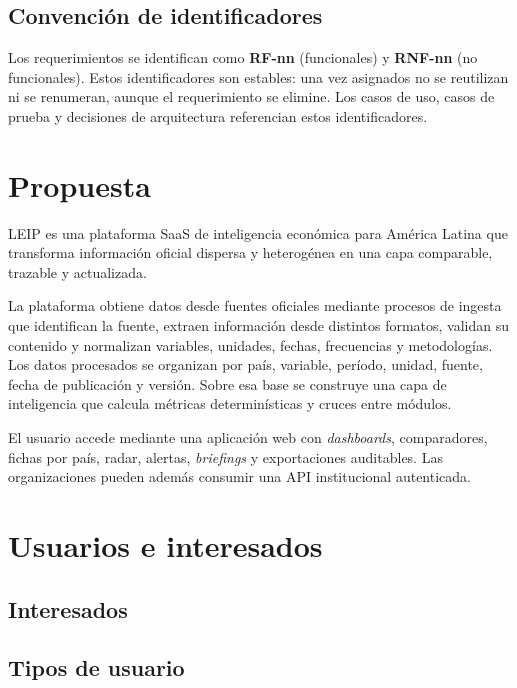 \documentclass[11pt,a4paper]{article}
\newcommand{\proyectoNombre}{LEIP}
\begin{document}
\subsection{Convenci\'on de identificadores}

Los requerimientos se identifican como \textbf{RF-nn} (funcionales) y
\textbf{RNF-nn} (no funcionales). Estos identificadores son estables: una vez
asignados no se reutilizan ni se renumeran, aunque el requerimiento se elimine.
Los casos de uso, casos de prueba y decisiones de arquitectura referencian estos
identificadores.

\section{Propuesta}

\proyectoNombre{} es una plataforma SaaS de inteligencia econ\'omica para
Am\'erica Latina que transforma informaci\'on oficial dispersa y heterog\'enea
en una capa comparable, trazable y actualizada.

La plataforma obtiene datos desde fuentes oficiales mediante procesos de ingesta
que identifican la fuente, extraen informaci\'on desde distintos formatos,
validan su contenido y normalizan variables, unidades, fechas, frecuencias y
metodolog\'ias. Los datos procesados se organizan por pa\'is, variable,
per\'iodo, unidad, fuente, fecha de publicaci\'on y versi\'on. Sobre esa base se
construye una capa de inteligencia que calcula m\'etricas determin\'isticas y
cruces entre m\'odulos.

El usuario accede mediante una aplicaci\'on web con \emph{dashboards},
comparadores, fichas por pa\'is, radar, alertas, \emph{briefings} y
exportaciones auditables. Las organizaciones pueden adem\'as consumir una API
institucional autenticada.

\section{Usuarios e interesados}

\subsection{Interesados}

\subsection{Tipos de usuario}
\end{document}
